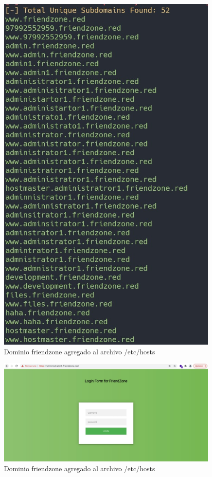         \begin{figure}[H]
            \centering
            \includegraphics[width=0.99\textwidth]{informe4/imagenes/friendzone/12_sublister2.png}
            \caption{Dominio friendzone agregado al archivo /etc/hosts} 
        \end{figure}

        \begin{figure}[H]
            \centering
            \includegraphics[width=0.99\textwidth]{informe4/imagenes/friendzone/13_administratorpage.png}
            \caption{Dominio friendzone agregado al archivo /etc/hosts} 
        \end{figure}

